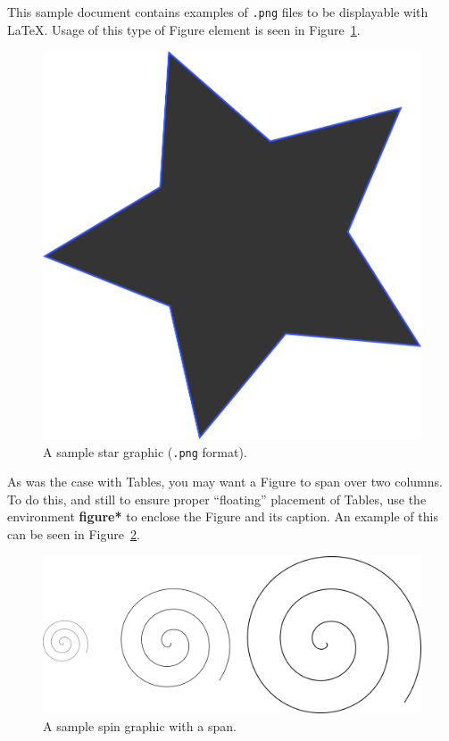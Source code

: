 \documentclass[article,english]{stucosrec}
\newcommand{\latex}{\LaTeX\xspace}
\begin{document}
	This sample document contains examples of \texttt{.png} files to be displayable with \latex.
	Usage of this type of Figure element is seen in Figure~\ref{fig:star}.
	
	\begin{figure}
		\centering
		\includegraphics[scale=0.5]{star.png}
		\caption{A sample star graphic (\texttt{.png} format).}
		\label{fig:star}
	\end{figure}

	As was the case with Tables, you may want a Figure to span over two columns.
	To do this, and still to ensure proper ``floating'' placement of Tables, use the environment \textbf{figure*} to enclose the Figure and its caption.
	An example of this can be seen in Figure~\ref{fig:spin}.
	
	\begin{figure}
	    \vspace{0.5cm} %
		\centering
		\includegraphics[scale=0.8]{spin.png}
		\caption{A sample spin graphic with a span.}
		\label{fig:spin}
	\end{figure}
	
\end{document}
